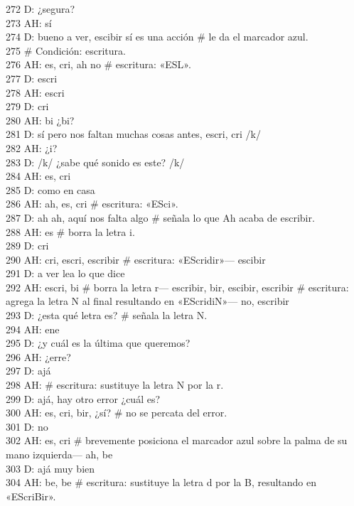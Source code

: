 272 D: ¿segura?\\
273 AH: sí\\
274 D: bueno a ver, escibir sí es una acción \# le da el marcador azul.\\
275 \# Condición: escritura.\\
276 AH: es, cri, ah no \# escritura: «ESL».\\
277 D: escri\\
278 AH: escri\\
279 D: cri\\
280 AH: bi ¿bi?\\
281 D: sí pero nos faltan muchas cosas antes, escri, cri /k/\\
282 AH: ¿i?\\
283 D: /k/ ¿sabe qué sonido es este? /k/\\
284 AH: es, cri\\
285 D: como en casa\\
286 AH: ah, es, cri \# escritura: «ESci».\\
287 D: ah ah, aquí nos falta algo \# señala lo que Ah acaba de escribir.\\
288 AH: es \# borra la letra i.\\
289 D: cri\\
290 AH: cri, escri, escribir \# escritura: «EScridir»--- escibir\\
291 D: a ver lea lo que dice\\
292 AH: escri, bi \# borra la letra r--- escribir, bir, escibir, escribir \# escritura: agrega la letra N al final resultando en «EScridiN»--- no, escribir\\
293 D: ¿esta qué letra es? \# señala la letra N.\\
294 AH: ene\\
295 D: ¿y cuál es la última que queremos?\\
296 AH: ¿erre?\\
297 D: ajá\\
298 AH: \# escritura: sustituye la letra N por la r.\\
299 D: ajá, hay otro error ¿cuál es?\\
300 AH: es, cri, bir, ¿sí? \# no se percata del error.\\
301 D: no\\
302 AH: es, cri \# brevemente posiciona el marcador azul sobre la palma de su mano izquierda--- ah, be\\
303 D: ajá muy bien\\
304 AH: be, be \# escritura: sustituye la letra d por la B, resultando en «EScriBir».\\
